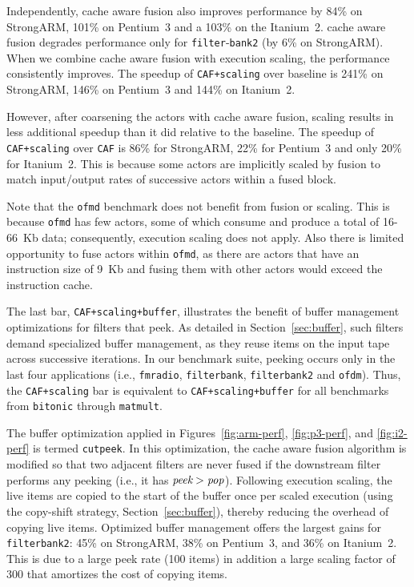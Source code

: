 \documentclass{sigplanconf}
\begin{document}
Independently, cache aware fusion also improves performance by 84\% on
StrongARM, 101\% on Pentium~3 and a 103\% on the Itanium~2.
cache aware fusion degrades performance only for
\texttt{filter}-\texttt{bank2} (by 6\% on StrongARM). When we combine
cache aware fusion with execution scaling, the performance
consistently improves.  The speedup of \texttt{CAF+scaling} over
baseline is 241\% on StrongARM, 146\% on Pentium~3 and 144\% on
Itanium~2.

However, after coarsening the actors with cache aware fusion, scaling
results in less additional speedup than it did relative to the
baseline.  The speedup of \texttt{CAF+scaling} over \texttt{CAF} is
86\% for StrongARM, 22\% for Pentium~3 and only 20\% for Itanium~2.
This is because some actors are implicitly scaled by fusion to match
input/output rates of successive actors within a fused block.

Note that the \texttt{ofmd} benchmark does not benefit from fusion or
scaling. This is because \texttt{ofmd} has few actors, some of which
consume and produce a total of 16-66~Kb data; consequently, execution
scaling does not apply.  Also there is limited opportunity to fuse
actors within \texttt{ofmd}, as there are actors that have an
instruction size of 9~Kb and fusing them with other actors would
exceed the instruction cache.

The last bar, {\tt CAF+scaling+buffer}, illustrates the benefit of
buffer management optimizations for filters that peek.  As detailed in
Section~\ref{sec:buffer}, such filters demand specialized buffer
management, as they reuse items on the input tape across successive
iterations.  In our benchmark suite, peeking occurs only in the last
four applications (i.e., \texttt{fmradio}, \texttt{filterbank},
\texttt{filterbank2} and \texttt{ofdm}).  Thus, the {\tt CAF+scaling}
bar is equivalent to {\tt CAF+scaling+buffer} for all benchmarks from
{\tt bitonic} through {\tt matmult}.

The buffer optimization applied in Figures~\ref{fig:arm-perf},
\ref{fig:p3-perf}, and \ref{fig:i2-perf} is termed {\tt cutpeek}.  In
this optimization, the cache aware fusion algorithm is modified so
that two adjacent filters are never fused if the downstream filter
performs any peeking (i.e., it has $\mbox{\it peek} > \mbox{\it
pop}$).  Following execution scaling, the live items are copied to the
start of the buffer once per scaled execution (using the copy-shift
strategy, Section~\ref{sec:buffer}), thereby reducing the overhead
of copying live items.  Optimized buffer management offers the largest
gains for {\tt filterbank2}: 45\% on StrongARM, 38\% on Pentium~3, and
36\% on Itanium~2.  This is due to a large peek rate (100 items) in
addition a large scaling factor of 300 that amortizes the cost of
copying items.
\end{document}
